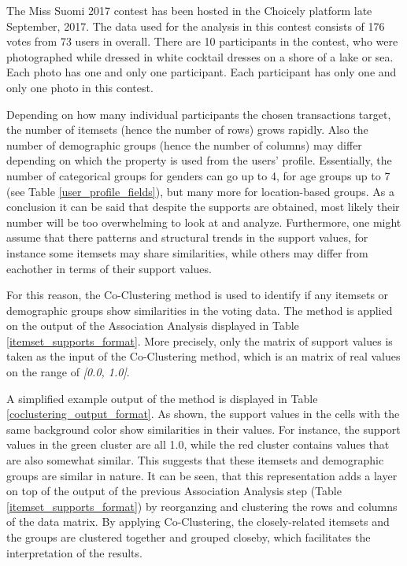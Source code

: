     The Miss Suomi 2017 contest has been hosted in the Choicely platform late September, 2017. The data used for the analysis in this contest consists of 176 votes from 73 users in overall. There are 10 participants in the contest, who were photographed while dressed in white cocktail dresses on a shore of a lake or sea. Each photo has one and only one participant. Each participant has only one and only one photo in this contest. 
    
    Depending on how many individual participants the chosen transactions target, the number of itemsets (hence the number of rows) grows rapidly. Also the number of demographic groups (hence the number of columns) may differ depending on which the property is used from the users' profile. Essentially, the number of categorical groups for genders can go up to 4, for age groups up to 7 (see Table \ref{user_profile_fields}), but many more for location-based groups. As a conclusion it can be said that despite the supports are obtained, most likely their number will be too overwhelming to look at and analyze. Furthermore, one might assume that there patterns and structural trends in the support values, for instance some itemsets may share similarities, while others may differ from eachother in terms of their support values.

    For this reason, the Co-Clustering method is used to identify if any itemsets or demographic groups show similarities in the voting data. The method is applied on the output of the Association Analysis displayed in Table \ref{itemset_supports_format}. More precisely, only the matrix of support values is taken as the input of the Co-Clustering method, which is an matrix of real values on the range of \emph{[0.0, 1.0]}. 
    
    A simplified example output of the method is displayed in Table \ref{coclustering_output_format}. As shown, the support values in the cells with the same background color show similarities in their values. For instance, the support values in the green cluster are all 1.0, while the red cluster contains values that are also somewhat similar. This suggests that these itemsets and demographic groups are similar in nature. It can be seen, that this representation adds a layer on top of the output of the previous Association Analysis step (Table \ref{itemset_supports_format}) by reorganzing and clustering the rows and columns of the data matrix. By applying Co-Clustering, the closely-related itemsets and the groups are clustered together and grouped closeby, which facilitates the interpretation of the results. 

